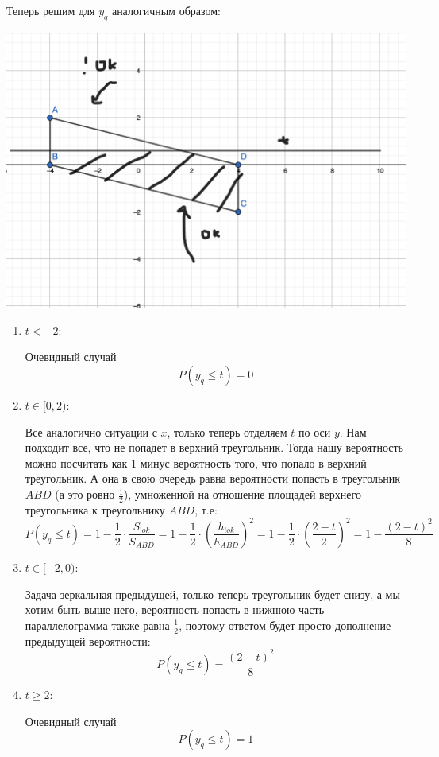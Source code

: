 \documentclass[a4paper,12pt]{article}
\begin{document}
Теперь решим для $y_q$  аналогичным образом:
\begin{center}
\includegraphics[scale=0.2]{2.png}
\end{center}
\begin{enumerate}
\item $t < -2$:

Очевидный случай
\[
P(y_q \leq t) = 0
\]

\item $t \in [0, 2)$:

Все аналогично ситуации с $x$, только теперь отделяем $t$ по оси $y$. Нам подходит все, что не попадет в верхний треугольник. Тогда нашу вероятность можно посчитать как 1 минус вероятность того, что попало в верхний треугольник. А она в свою очередь равна вероятности попасть в треугольник $ABD$ (а это ровно $\frac12$),  умноженной на отношение площадей верхнего треугольника к треугольнику $ABD$, т.е:
\[
P(y_q \leq t) = 1 - \frac{1}{2} \cdot \frac{S_{!ok}}{S_{ABD}} =  1 - \frac12 \cdot \left( \frac{h_{!ok}}{h_{ABD}} \right)^2 =  1 - \frac{1}{2} \cdot \left( \frac{2-t}{2} \right)^2 = 1 - \frac{(2-t)^2}{8}
\]

\item $t \in [-2, 0)$:

Задача зеркальная предыдущей, только теперь треугольник будет снизу, а мы хотим быть выше него, вероятность попасть в нижнюю часть параллелограмма также равна $\frac{1}{2}$, поэтому ответом будет просто дополнение предыдущей вероятности:
\[
P(y_q \leq t) =  \frac{(2-t)^2}{8}
\]
\item $t \geq 2$:

Очевидный случай
\[
P(y_q \leq t) = 1
\]
\end{enumerate}
\clearpage
\end{document}
